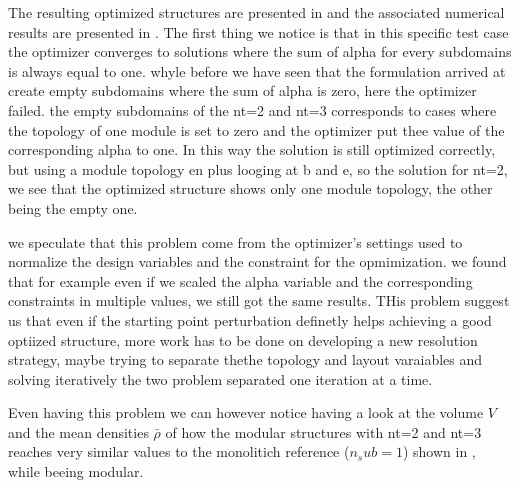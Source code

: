 The resulting optimized structures are presented in  and the associated numerical results are presented in . The first thing we notice is that in this specific test case the optimizer converges to solutions where the sum of alpha for every subdomains is always equal to one. whyle before we have seen that the formulation arrived at create empty subdomains where the sum of alpha is zero, here the optimizer failed. the empty subdomains of the nt=2 and nt=3 corresponds to cases where the topology of one module is set to zero and the optimizer put thee value of the corresponding alpha to one. In this way the solution is still optimized correctly, but using a module topology en plus \eg looging at b and e, so the solution for nt=2, we see that the optimized structure shows only one module topology, the other being the empty one.

we speculate that this problem come from the optimizer's settings used to normalize the design variables and the constraint for the opmimization. we found that for example even if we scaled the alpha variable and the corresponding constraints in multiple values, we still got the same results. THis problem suggest us that even if the starting point perturbation definetly helps achieving a good optiized structure, more work has to be done on developing a new resolution strategy, maybe trying to separate thethe topology and layout varaiables and solving iteratively the two problem separated one iteration at a time.

Even having this problem we can however notice having a look at the volume $V$ and the mean densities $\bar{\rho}$ of  how the modular structures with nt=2 and nt=3 reaches very similar values to the monolitich reference ($n_sub=1$) shown in , while beeing modular.

